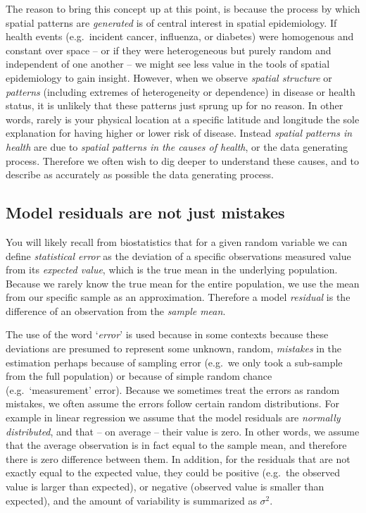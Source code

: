 \documentclass[
]{book}
\begin{document}
The reason to bring this concept up at this point, is because the process by which spatial patterns are \emph{generated} is of central interest in spatial epidemiology. If health events (e.g.~incident cancer, influenza, or diabetes) were homogenous and constant over space -- or if they were heterogeneous but purely random and independent of one another -- we might see less value in the tools of spatial epidemiology to gain insight. However, when we observe \emph{spatial structure} or \emph{patterns} (including extremes of heterogeneity or dependence) in disease or health status, it is unlikely that these patterns just sprung up for no reason. In other words, rarely is your physical location at a specific latitude and longitude the sole explanation for having higher or lower risk of disease. Instead \emph{spatial patterns in health} are due to \emph{spatial patterns in the causes of health}, or the data generating process. Therefore we often wish to dig deeper to understand these causes, and to describe as accurately as possible the data generating process.

\hypertarget{model-residuals-are-not-just-mistakes}{%
\subsection{Model residuals are not just mistakes}\label{model-residuals-are-not-just-mistakes}}

You will likely recall from biostatistics that for a given random variable we can define \emph{statistical error} as the deviation of a specific observations measured value from its \emph{expected value}, which is the true mean in the underlying population. Because we rarely know the true mean for the entire population, we use the mean from our specific sample as an approximation. Therefore a model \emph{residual} is the difference of an observation from the \emph{sample mean}.

The use of the word `\emph{error}' is used because in some contexts because these deviations are presumed to represent some unknown, random, \emph{mistakes} in the estimation perhaps because of sampling error (e.g.~we only took a sub-sample from the full population) or because of simple random chance (e.g.~`measurement' error). Because we sometimes treat the errors as random mistakes, we often assume the errors follow certain random distributions. For example in linear regression we assume that the model residuals are \emph{normally distributed}, and that -- on average -- their value is zero. In other words, we assume that the average observation is in fact equal to the sample mean, and therefore there is zero difference between them. In addition, for the residuals that are not exactly equal to the expected value, they could be positive (e.g.~the observed value is larger than expected), or negative (observed value is smaller than expected), and the amount of variability is summarized as \(\sigma^2\).
\end{document}
